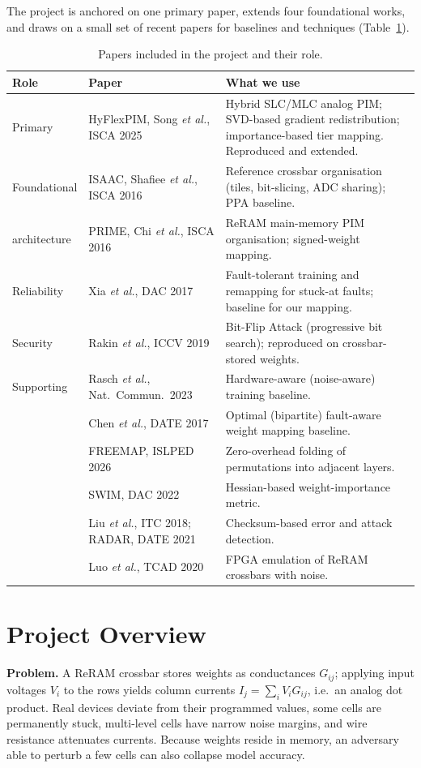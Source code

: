 \documentclass[10pt,a4paper]{article}
\begin{document}
The project is anchored on one primary paper, extends four foundational works, and draws on a small
set of recent papers for baselines and techniques (Table~\ref{tab:papers}).

\begin{table}[h]
\centering\small
\caption{Papers included in the project and their role.}\label{tab:papers}
\begin{tabularx}{\linewidth}{@{}l l X@{}}
\toprule
Role & Paper & What we use \\
\midrule
Primary & HyFlexPIM, Song \emph{et al.}, ISCA 2025 & Hybrid SLC/MLC analog PIM; SVD-based gradient redistribution; importance-based tier mapping. Reproduced and extended. \\
Foundational & ISAAC, Shafiee \emph{et al.}, ISCA 2016 & Reference crossbar organisation (tiles, bit-slicing, ADC sharing); PPA baseline. \\
architecture & PRIME, Chi \emph{et al.}, ISCA 2016 & ReRAM main-memory PIM organisation; signed-weight mapping. \\
Reliability & Xia \emph{et al.}, DAC 2017 & Fault-tolerant training and remapping for stuck-at faults; baseline for our mapping. \\
Security & Rakin \emph{et al.}, ICCV 2019 & Bit-Flip Attack (progressive bit search); reproduced on crossbar-stored weights. \\
\midrule
Supporting & Rasch \emph{et al.}, Nat.\ Commun.\ 2023 & Hardware-aware (noise-aware) training baseline. \\
 & Chen \emph{et al.}, DATE 2017 & Optimal (bipartite) fault-aware weight mapping baseline. \\
 & FREEMAP, ISLPED 2026 & Zero-overhead folding of permutations into adjacent layers. \\
 & SWIM, DAC 2022 & Hessian-based weight-importance metric. \\
 & Liu \emph{et al.}, ITC 2018; RADAR, DATE 2021 & Checksum-based error and attack detection. \\
 & Luo \emph{et al.}, TCAD 2020 & FPGA emulation of ReRAM crossbars with noise. \\
\bottomrule
\end{tabularx}
\end{table}

\section{Project Overview}

\textbf{Problem.} A ReRAM crossbar stores weights as conductances $G_{ij}$; applying input voltages
$V_i$ to the rows yields column currents $I_j=\sum_i V_i G_{ij}$, i.e.\ an analog dot product. Real
devices deviate from their programmed values, some cells are permanently stuck, multi-level cells have
narrow noise margins, and wire resistance attenuates currents. Because weights reside in memory, an
adversary able to perturb a few cells can also collapse model accuracy.
\end{document}
